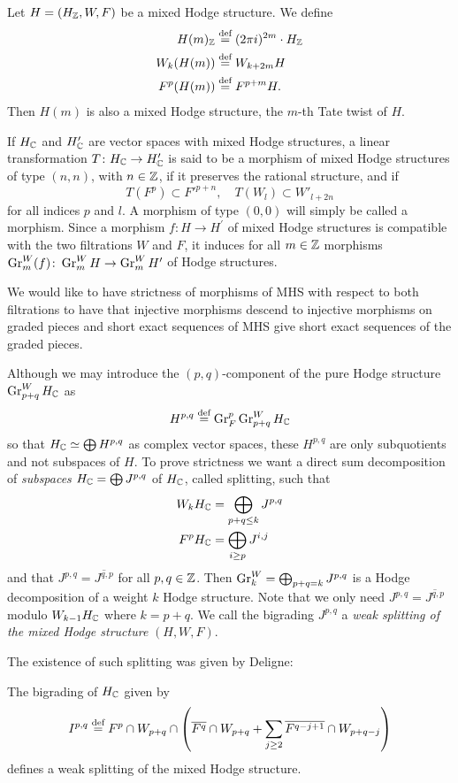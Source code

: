 \documentclass[../main.tex]{subfiles}
\begin{document}
\begin{es}
Let $H = (H_{\mathbb{Z}},W,F)$ be a mixed Hodge structure. We define
\begin{align*}
H(m)_{\mathbb{Z}} &\stackrel{\text{def}}{=} (2 \pi i)^{2m} \cdot H_{\mathbb{Z}} \\
W_k(H(m)) &\stackrel{\text{def}}{=} W_{k+2m} H \\
F^p (H(m)) &\stackrel{\text{def}}{=} F^{p+m} H.
\end{align*}
Then $H(m)$ is also a mixed Hodge structure, the $m$-th Tate twist of $H$.
\end{es}
If $H_{\mathbb{C}}$ and $H_{\mathbb{C}}^{\prime}$ are vector spaces with mixed Hodge structures, a linear transformation $T \colon H_{\mathbb{C}} \to H_{\mathbb{C}}^{\prime}$ is said to be a morphism of mixed Hodge structures of type $(n, n)$, with $n \in \mathbb{Z}$, if it preserves the rational structure, and if 
\[
T(F^p) \subset F'^{p+n} , \quad   T(W_l) \subset W'_{l+2n}
\] 
for all indices $p$ and $l$. A morphism of type $(0, 0)$ will simply be called a morphism. 
Since a morphism $f \colon H \to H^\prime$ of mixed Hodge structures is compatible with the two filtrations $W$ and $F$, it induces for all $m \in \mathbb{Z}$ morphisms $\operatorname{Gr}^W_m (f) \colon \operatorname{Gr}_m^W H \to \operatorname{Gr}^W_m H^\prime$ of Hodge structures.

We would like to have strictness of morphisms of MHS with respect to both filtrations to have that injective morphisms descend to injective morphisms on graded pieces and short exact sequences of MHS give short exact sequences of the graded pieces.

Although we may introduce the $(p,q)$-component of the pure Hodge structure $\operatorname{Gr}^W_{p+q} H_{\mathbb{C}}$ as 
\[
H^{p,q} \stackrel{\text{def}}{=} \operatorname{Gr}^p_F \operatorname{Gr}^W_{p+q} H_{\mathbb{C}}
\]
so that $H_{\mathbb{C}} \simeq \bigoplus H^{p,q}$ as complex vector spaces, these $H^{p,q}$ are only subquotients and not subspaces of $H$. To prove strictness we want a direct sum decomposition of \emph{subspaces} $H_{\mathbb{C}} = \bigoplus J^{p,q}$ of $H_{\mathbb{C}}$, called splitting, such that 
\begin{align*}
    W_k H_{\mathbb{C}} &= \bigoplus_{p+q \leq k} J^{p,q} \\
    F^p H_{\mathbb{C}} &= \bigoplus_{i \geq p} J^{i,j}
\end{align*}
and that $J^{p,q} = \overline{J^{q,p}}$ for all $p,q \in \mathbb{Z}$.
Then $\operatorname{Gr}^W_k = \bigoplus_{p+q=k} J^{p,q} $ is a Hodge decomposition of a weight $k$ Hodge structure. Note that we only need $J^{p,q} = \overline{J^{q,p}}$ modulo $W_{k-1} H_{\mathbb{C}}$ where $k=p+q$. We call the bigrading $J^{p,q}$ a \emph{weak splitting of the mixed Hodge structure} $(H,W,F)$.

The existence of such splitting was given by Deligne:
\begin{lemma} \textup{ \cite[Lemme 1.2.10]{Del71}}
    The bigrading of $H_{\mathbb{C}}$ given by
    \[
    I^{p,q} \stackrel{\text{def}}{=} F^p \cap W_{p+q} \cap \left( \overline{F^q} \cap W_{p+q} + \sum_{j \geq 2} \overline{F^{q-j+1}} \cap W_{p+q-j} \right)
    \]
    defines a weak splitting of the mixed Hodge structure.
\end{lemma}
\end{document}
